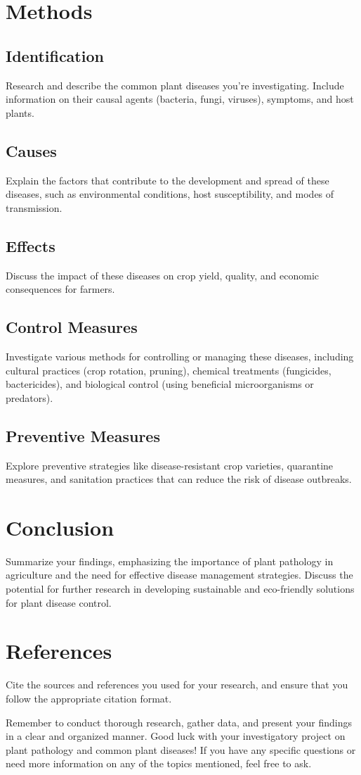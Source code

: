 \documentclass[11pt]{article}
\begin{document}
\section{Methods}

   \subsection{ Identification} Research and describe the common plant diseases you're investigating. Include information on their causal agents (bacteria, fungi, viruses), symptoms, and host plants.

    \subsection{Causes} Explain the factors that contribute to the development and spread of these diseases, such as environmental conditions, host susceptibility, and modes of transmission.

    \subsection{Effects} Discuss the impact of these diseases on crop yield, quality, and economic consequences for farmers.

    \subsection{Control Measures} Investigate various methods for controlling or managing these diseases, including cultural practices (crop rotation, pruning), chemical treatments (fungicides, bactericides), and biological control (using beneficial microorganisms or predators).

   \subsection{ Preventive Measures} Explore preventive strategies like disease-resistant crop varieties, quarantine measures, and sanitation practices that can reduce the risk of disease outbreaks.

\section{Conclusion}
Summarize your findings, emphasizing the importance of plant pathology in agriculture and the need for effective disease management strategies. Discuss the potential for further research in developing sustainable and eco-friendly solutions for plant disease control.

\section{References}
Cite the sources and references you used for your research, and ensure that you follow the appropriate citation format.

Remember to conduct thorough research, gather data, and present your findings in a clear and organized manner. Good luck with your investigatory project on plant pathology and common plant diseases! If you have any specific questions or need more information on any of the topics mentioned, feel free to ask.
\end{document}
